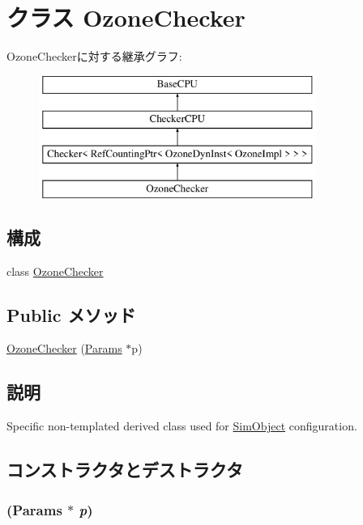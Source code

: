 \hypertarget{classOzoneChecker}{
\section{クラス OzoneChecker}
\label{classOzoneChecker}
}
OzoneCheckerに対する継承グラフ:\begin{figure}[H]
\begin{center}
\leavevmode
\includegraphics[height=4cm]{classOzoneChecker}
\end{center}
\end{figure}
\subsection*{構成}
\begin{DoxyCompactItemize}
\item 
class \hyperlink{classOzoneChecker_1_1OzoneChecker}{OzoneChecker}
\end{DoxyCompactItemize}
\subsection*{Public メソッド}
\begin{DoxyCompactItemize}
\item 
\hyperlink{classOzoneChecker_a2841d12dd0176d8a4dfb4a94e3804980}{OzoneChecker} (\hyperlink{classCheckerCPU_a56bf98a1e02b979e88cbf64420995961}{Params} $\ast$p)
\end{DoxyCompactItemize}


\subsection{説明}
Specific non-\/templated derived class used for \hyperlink{classSimObject}{SimObject} configuration. 

\subsection{コンストラクタとデストラクタ}
\hypertarget{classOzoneChecker_a2841d12dd0176d8a4dfb4a94e3804980}{
\subsubsection[{OzoneChecker}]{ ({\bf Params} $\ast$ {\em p})}}
\label{classOzoneChecker_a2841d12dd0176d8a4dfb4a94e3804980}



